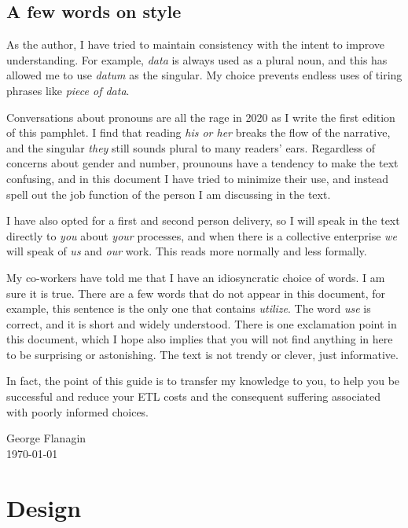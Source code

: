 \documentclass[11pt,letterpaper,twosided]{memoir}
\begin{document}
\section{A few words on style}

As the author, I have tried to maintain consistency with the intent
to improve understanding. For example, \emph{data} is always used
as a plural noun, and this has allowed me to use \emph{datum} as
the singular. My choice prevents endless uses of tiring phrases like
\emph{piece of data}.

Conversations about pronouns are all the rage in 2020 as I write
the first edition of this pamphlet. I find that reading \emph{his
or her} breaks the flow of the narrative, and the singular \emph{they}
still sounds plural to many readers' ears. Regardless of concerns
about gender and number, prounouns have a tendency to make the text
confusing, and in this document I have tried to minimize their use,
and instead spell out the job function of the person I am discussing
in the text.

I have also opted for a first and second person delivery, so I will
speak in the text directly to \emph{you} about \emph{your} processes,
and when there is a collective enterprise \emph{we} will speak of
\emph{us} and \emph{our} work. This reads more normally and less
formally.

My co-workers have told me that I have an idiosyncratic choice of
words. I am sure it is true. There are a few words that do not appear 
in this document, for example, this sentence is the only one that
contains \emph{utilize}. The word \emph{use} is correct, and it is
short and widely understood. There is one exclamation point in
this document, which I hope also implies that you will not find
anything in here to be surprising or astonishing. The text is not
trendy or clever, just informative.

In fact, 
the point of this guide is to transfer my knowledge to you, to help
you be successful and reduce your ETL costs and the consequent 
suffering associated with poorly informed choices.

\begin{flushright}George Flanagin\\\today\end{flushright}

\mainmatter
\chapter{Design}
\end{document}
